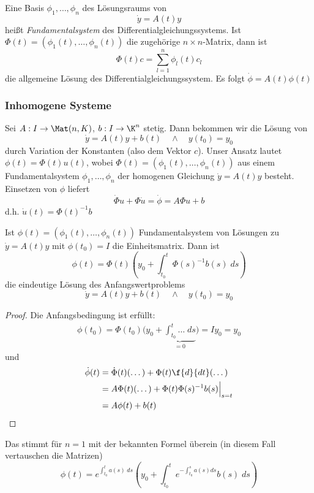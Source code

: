 \documentclass[a4paper,10pt]{scrartcl}
\begin{document}
Eine Basis $\phi_1,\dotsc, \phi_n$ des Lösungsraums von
\[
	\dot y = A(t) y
\]
heißt \emph{Fundamentalsystem} des Differentialgleichungssystems.
Ist $\Phi(t) = (\phi_1(t), \dotsc, \phi_n(t))$ die zugehörige $n\times n$-Matrix, dann ist
\[
	\Phi(t) c = \sum_{l=1}^n \phi_l(t) c_l
\]
die allgemeine Lösung des Differentialgleichungssystem.
Es folgt $\dot \phi = A(t) \phi(t)$


\subsubsection{Inhomogene Systeme}

Sei $A : I \to \Mat(n,K)$, $b:I\to \K^n$ stetig.
Dann bekommen wir die Lösung von
\[
	\dot y = A(t)y + b(t) \quad \land \quad y(t_0) = y_0
\]
durch Variation der Konstanten (also dem Vektor $c$).
Unser Ansatz lautet	$\phi(t) = \Phi(t) u(t)$, wobei
$\Phi(t) = (\phi_1(t),\dotsc, \phi_n(t))$ aus einem Fundamentalsystem $\phi_1,\dotsc, \phi_n$ der homogenen Gleichung $\dot y = A(t)y$ besteht.
Einsetzen von $\phi$ liefert
\[
	\dot \Phi u + \Phi \dot u = \dot \phi = A\Phi u + b
\]
d.h. $\dot u(t) = \Phi(t)^{-1}b$

\begin{st}
	Ist $\phi(t) = (\phi_1(t),\dotsc, \phi_n(t))$ Fundamentalsystem von Lösungen zu $\dot y = A(t)y$ mit $\phi(t_0) = I$ die Einheitsmatrix.
	Dann ist
	\[
		\phi(t) = \Phi(t)\left(y_0 + \int_{t_0}^t\Phi(s)^{-1}b(s) \; ds\right)
	\]
	die eindeutige Lösung des Anfangswertproblems
	\[
		\dot y = A(t)y + b(t) \quad \land \quad y(t_0) = y_0
	\]
	\begin{proof}
		\fixme[Ergänzen]
		Die Anfangsbedingung ist erfüllt:
		\begin{align*}
			\phi(t_0) = \Phi(t_0) \Big(y_0+\underbrace{\int_{t_0}^t \dotso \;ds}_{=0} \Big) = I y_0 = y_0
		\end{align*}
		und
		\begin{align*}
			\dot \phi(t) &= \dot \Phi(t) (\dotso) + \Phi(t) \f {d}{dt}(\dotso)\\
			&= A\Phi(t)(\dotso) + \Phi(t)\Phi(s)^{-1}b(s)\Big|_{s=t}\\
			&= A\phi(t) + b(t)
		\end{align*}
	\end{proof}
	\begin{note}
		Das stimmt für $n=1$ mit der bekannten Formel überein (in diesem Fall vertauschen die Matrizen)
		\[
			\phi(t) = e^{\int_{t_0}^t a(s) \;ds} \left(y_0 + \int_{t_0}^t e^{-\int_{t_0}^s a(s) ds} b(s) \;ds\right)
		\]
	\end{note}
\end{st}
\end{document}
